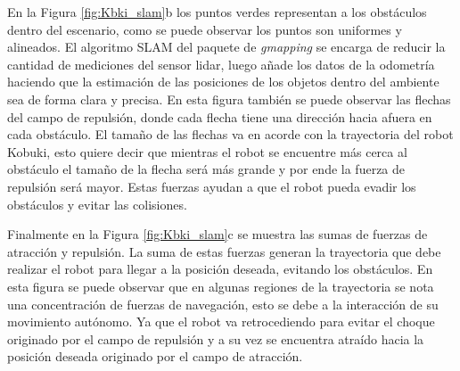 En la Figura \ref{fig:Kbki_slam}b los puntos verdes representan a los obstáculos dentro
del escenario, como se puede observar los puntos son uniformes y alineados. El algoritmo
SLAM del paquete de \textit{gmapping} se encarga de reducir la cantidad de mediciones del
sensor lidar, luego añade los datos de la odometría haciendo que la estimación de las 
posiciones de los objetos dentro del ambiente sea de forma clara y precisa. En esta figura
también se puede observar las flechas del campo de repulsión, donde cada flecha tiene una
dirección hacia afuera en cada obstáculo. El tamaño de las flechas va en acorde con la 
trayectoria del robot Kobuki, esto quiere decir que mientras el robot se encuentre más
cerca al obstáculo el tamaño de la flecha será más grande y por ende la fuerza de 
repulsión será mayor. Estas fuerzas ayudan a que el robot pueda evadir los obstáculos
y evitar las colisiones. 

Finalmente en la Figura \ref{fig:Kbki_slam}c se muestra las sumas de fuerzas de atracción y
repulsión. La suma de estas fuerzas generan la trayectoria que debe realizar el robot
para llegar a la posición deseada, evitando los obstáculos. En esta figura se puede observar
que en algunas regiones de la trayectoria se nota una concentración de fuerzas de navegación, 
esto se debe a la interacción de su movimiento autónomo. Ya que el robot va retrocediendo para
evitar el choque originado por el campo de repulsión y a su vez se encuentra atraído hacia 
la posición deseada originado por el campo de atracción.


